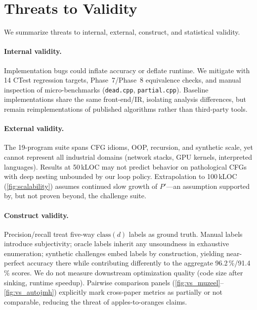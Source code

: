 \documentclass[acmsmall,screen,review,anonymous]{acmart}
\begin{document}
\section{Threats to Validity}
\label{sec:threats}
We summarize threats to internal, external, construct, and statistical validity.

\paragraph{Internal validity.}
Implementation bugs could inflate accuracy or deflate runtime. We mitigate with 14 CTest regression targets, Phase~7/Phase~8 equivalence checks, and manual inspection of micro-benchmarks (\texttt{dead.cpp}, \texttt{partial.cpp}). Baseline implementations share the same front-end/IR, isolating analysis differences, but remain reimplementations of published algorithms rather than third-party tools.

\paragraph{External validity.}
The 19-program suite spans CFG idioms, OOP, recursion, and synthetic scale, yet cannot represent all industrial domains (network stacks, GPU kernels, interpreted languages). Results at 50\,kLOC may not predict behavior on pathological CFGs with deep nesting unbounded by our loop policy. Extrapolation to 100\,kLOC (\autoref{fig:scalability}) assumes continued slow growth of $P'$---an assumption supported by, but not proven beyond, the challenge suite.

\paragraph{Construct validity.}
Precision/recall treat five-way $\mathrm{class}(d)$ labels as ground truth. Manual labels introduce subjectivity; oracle labels inherit any unsoundness in exhaustive enumeration; synthetic challenges embed labels by construction, yielding near-perfect accuracy there while contributing differently to the aggregate 96.2\,\%/91.4\,\% scores. We do not measure downstream optimization quality (code size after sinking, runtime speedup). Pairwise comparison panels (\autoref{fig:vs_muzeel}--\autoref{fig:vs_autojmh}) explicitly mark cross-paper metrics as partially or not comparable, reducing the threat of apples-to-oranges claims.
\end{document}
